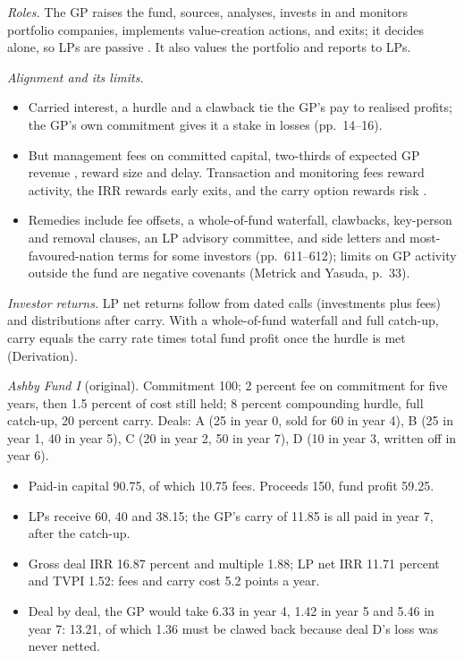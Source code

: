\begin{qfmethod}\label{meth:gp-alignment-net-returns}
 \emph{Roles.} The GP raises the fund, sources, analyses, invests in and monitors portfolio companies, implements value-creation actions, and exits; it decides alone, so LPs are passive \citep[pp.~13--15]{ippolito-private-capital-2020}. It also values the portfolio and reports to LPs.

\emph{Alignment and its limits.}
\begin{itemize}
\item Carried interest, a hurdle and a clawback tie the GP's pay to realised profits; the GP's own commitment gives it a stake in losses (pp.~14--16).
\item But management fees on committed capital, two-thirds of expected GP revenue \citep[p.~35]{metrick-yasuda-survey-2011}, reward size and delay. Transaction and monitoring fees reward activity, the IRR rewards early exits, and the carry option rewards risk \citep[pp.~610--614]{s7-ang}.
\item Remedies include fee offsets, a whole-of-fund waterfall, clawbacks, key-person and removal clauses, an LP advisory committee, and side letters and most-favoured-nation terms for some investors (pp.~611--612); limits on GP activity outside the fund are negative covenants (Metrick and Yasuda, p.~33).
\end{itemize}

\emph{Investor returns.} LP net returns follow from dated calls (investments plus fees) and distributions after carry. With a whole-of-fund waterfall and full catch-up, carry equals the carry rate times total fund profit once the hurdle is met (Derivation).

 \emph{Ashby Fund I} (original). Commitment 100; 2 percent fee on commitment for five years, then 1.5 percent of cost still held; 8 percent compounding hurdle, full catch-up, 20 percent carry. Deals: A (25 in year 0, sold for 60 in year 4), B (25 in year 1, 40 in year 5), C (20 in year 2, 50 in year 7), D (10 in year 3, written off in year 6).
\begin{itemize}
\item Paid-in capital 90.75, of which 10.75 fees. Proceeds 150, fund profit 59.25.
\item LPs receive 60, 40 and 38.15; the GP's carry of 11.85 is all paid in year 7, after the catch-up.
\item Gross deal IRR 16.87 percent and multiple 1.88; LP net IRR 11.71 percent and TVPI 1.52: fees and carry cost 5.2 points a year.
\item Deal by deal, the GP would take 6.33 in year 4, 1.42 in year 5 and 5.46 in year 7: 13.21, of which 1.36 must be clawed back because deal D's loss was never netted.
\end{itemize}


\end{qfmethod}
